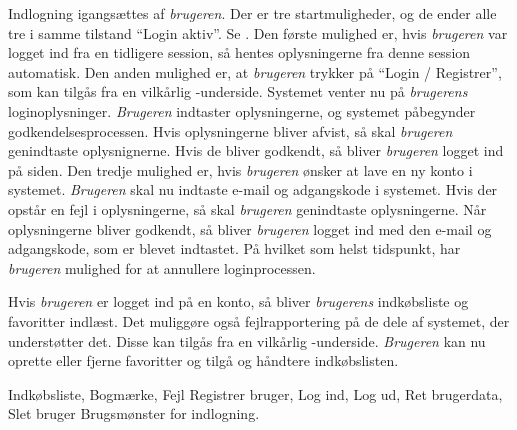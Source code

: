{Indlogning igangsættes af \textit{brugeren}. Der er tre startmuligheder, og de ender alle tre i samme tilstand “Login aktiv”. Se . Den første mulighed er, hvis \textit{brugeren} var logget ind fra en tidligere session, så hentes oplysningerne fra denne session automatisk. Den anden mulighed er, at \textit{brugeren} trykker på “Login / Registrer”, som kan tilgås fra en vilkårlig \Foodl-underside. Systemet venter nu på \textit{brugerens} loginoplysninger. \textit{Brugeren} indtaster oplysningerne, og systemet påbegynder godkendelsesprocessen. Hvis oplysningerne bliver afvist, så skal \textit{brugeren} genindtaste oplysnignerne. Hvis de bliver godkendt, så bliver \textit{brugeren} logget ind på siden. Den tredje mulighed er, hvis \textit{brugeren} ønsker at lave en ny konto i systemet. \textit{Brugeren} skal nu indtaste e-mail og adgangskode i systemet. Hvis der opstår en fejl i oplysningerne, så skal \textit{brugeren} genindtaste oplysningerne. Når oplysningerne bliver godkendt, så bliver \textit{brugeren} logget ind med den e-mail og adgangskode, som er blevet indtastet. På hvilket som helst tidspunkt, har \textit{brugeren} mulighed for at annullere loginprocessen.

Hvis \textit{brugeren} er logget ind på en konto, så bliver \textit{brugerens} indkøbsliste og favoritter indlæst. Det muliggøre også fejlrapportering på de dele af systemet, der understøtter det. Disse kan tilgås fra en vilkårlig \Foodl-underside. \textit{Brugeren} kan nu oprette eller fjerne favoritter og tilgå og håndtere indkøbslisten.}
{Indkøbsliste, Bogmærke, Fejl}
{Registrer bruger, Log ind, Log ud, Ret brugerdata, Slet bruger}
{Brugsmønster for indlogning.}
